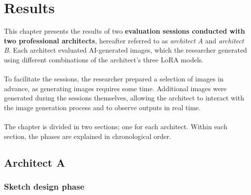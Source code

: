 \chapter{Results}
This chapter presents the results of two \textbf{evaluation sessions conducted with two professional architects}, hereafter referred to as \textit{architect A} and \textit{architect B}. Each architect evaluated AI-generated images, which the researcher generated using different combinations of the architect's three LoRA models.\\~\\
To facilitate the sessions, the researcher prepared a selection of images in advance, as generating images requires some time. Additional images were generated during the sessions themselves, allowing the architect to interact with the image generation process and to observe outputs in real time.\\~\\
The chapter is divided in two sections; one for each architect. Within each section, the phases are explained in chronological order.
\newpage
\section{Architect A}
\subsection{Sketch design phase}

